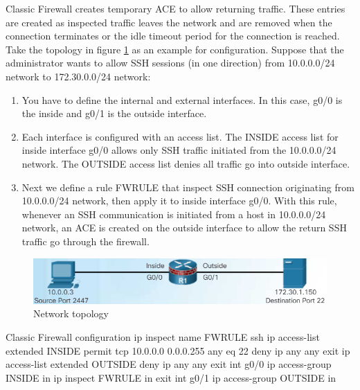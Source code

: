 Classic Firewall creates temporary ACE to allow returning traffic. These entries are created as inspected traffic leaves the network and are removed when the connection terminates or the idle timeout period for the connection is reached.\\

Take the topology in figure \ref{ClassicConfig} as an example for configuration. Suppose that the administrator wants to allow SSH sessions (in one direction) from 10.0.0.0/24 network to 172.30.0.0/24 network:

\begin{enumerate}
\item You have to define the internal and external interfaces. In this case, g0/0 is the inside and g0/1 is the outside interface.

\item Each interface is configured with an access list. The INSIDE access list for inside interface g0/0 allows only SSH traffic initiated from the 10.0.0.0/24 network. The OUTSIDE access list denies all traffic go into outside interface.

\item Next we define a rule FWRULE that inspect SSH connection originating from 10.0.0.0/24 network, then apply it to inside interface g0/0. With this rule, whenever an SSH communication is initiated from a host in 10.0.0.0/24 network, an ACE is created on the outside interface to allow the return SSH traffic go through the firewall.
\end{enumerate}

\begin{figure}[hbtp]
\caption{Network topology}\label{ClassicConfig}
\centering
\includegraphics[width=10\xm]{pictures/ClassicConfig.PNG}
\end{figure}


\begin{sexylisting}{Classic Firewall configuration}
ip inspect name FWRULE ssh
ip access-list extended INSIDE
	permit tcp 10.0.0.0 0.0.0.255 any eq 22
	deny ip any any
	exit
ip access-list extended OUTSIDE
	deny ip any any
	exit	
int g0/0
	ip access-group INSIDE in
	ip inspect FWRULE in
	exit	
int g0/1
	ip access-group OUTSIDE in		
\end{sexylisting}

